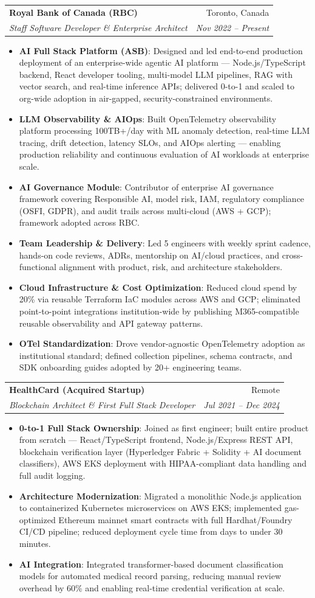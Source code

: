 \documentclass[letterpaper,9.5pt]{article}
\makeatletter
\newcommand{\resumeItem}[2]{\item\small{\textbf{#1}{: #2 \vspace{-2pt}}}}
\newcommand{\resumeSubheading}[4]{\vspace{-2pt}\item\begin{tabular*}{0.97\textwidth}{l@{\extracolsep{\fill}}r}\textbf{#1} & #2 \\\textit{\small#3} & \textit{\small #4} \\\end{tabular*}\vspace{-6pt}}
\newcommand{\resumeItemListStart}{\begin{itemize}}
\newcommand{\resumeItemListEnd}{\end{itemize}\vspace{-6pt}}
\makeatother
\begin{document}
  \resumeSubheading
    {Royal Bank of Canada (RBC)}{Toronto, Canada}
    {Staff Software Developer \& Enterprise Architect}{Nov 2022 -- Present}
  \resumeItemListStart
    \resumeItem{AI Full Stack Platform (ASB)}{Designed and led end-to-end production deployment of an enterprise-wide agentic AI platform — Node.js/TypeScript backend, React developer tooling, multi-model LLM pipelines, RAG with vector search, and real-time inference APIs; delivered 0-to-1 and scaled to org-wide adoption in air-gapped, security-constrained environments.}
    \resumeItem{LLM Observability \& AIOps}{Built OpenTelemetry observability platform processing 100TB+/day with ML anomaly detection, real-time LLM tracing, drift detection, latency SLOs, and AIOps alerting — enabling production reliability and continuous evaluation of AI workloads at enterprise scale.}
    \resumeItem{AI Governance Module}{Contributor of enterprise AI governance framework covering Responsible AI, model risk, IAM, regulatory compliance (OSFI, GDPR), and audit trails across multi-cloud (AWS + GCP); framework adopted across RBC.}
    \resumeItem{Team Leadership \& Delivery}{Led 5 engineers with weekly sprint cadence, hands-on code reviews, ADRs, mentorship on AI/cloud practices, and cross-functional alignment with product, risk, and architecture stakeholders.}
    \resumeItem{Cloud Infrastructure \& Cost Optimization}{Reduced cloud spend by 20\% via reusable Terraform IaC modules across AWS and GCP; eliminated point-to-point integrations institution-wide by publishing M365-compatible reusable observability and API gateway patterns.}
    \resumeItem{OTel Standardization}{Drove vendor-agnostic OpenTelemetry adoption as institutional standard; defined collection pipelines, schema contracts, and SDK onboarding guides adopted by 20+ engineering teams.}
  \resumeItemListEnd

  \resumeSubheading
    {HealthCard (Acquired Startup)}{Remote}
    {Blockchain Architect \& First Full Stack Developer}{Jul 2021 -- Dec 2024}
  \resumeItemListStart
    \resumeItem{0-to-1 Full Stack Ownership}{Joined as first engineer; built entire product from scratch — React/TypeScript frontend, Node.js/Express REST API, blockchain verification layer (Hyperledger Fabric + Solidity + AI document classifiers), AWS EKS deployment with HIPAA-compliant data handling and full audit logging.}
    \resumeItem{Architecture Modernization}{Migrated a monolithic Node.js application to containerized Kubernetes microservices on AWS EKS; implemented gas-optimized Ethereum mainnet smart contracts with full Hardhat/Foundry CI/CD pipeline; reduced deployment cycle time from days to under 30 minutes.}
    \resumeItem{AI Integration}{Integrated transformer-based document classification models for automated medical record parsing, reducing manual review overhead by 60\% and enabling real-time credential verification at scale.}
  \resumeItemListEnd
\end{document}
